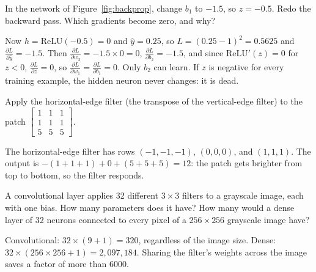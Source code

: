 \begin{Exercise}[label=dl4, title={A dead ReLU}, space=3cm]
In the network of Figure~\ref{fig:backprop}, change $b_1$ to $-1.5$, so $z = -0.5$. Redo the backward pass. Which
gradients become zero, and why?
\end{Exercise}
\begin{Answer}[ref=dl4]
Now $h = \mathrm{ReLU}(-0.5) = 0$ and $\hat{y} = 0.25$, so $L = (0.25 - 1)^2 = 0.5625$ and
$\frac{\partial L}{\partial \hat{y}} = -1.5$. Then $\frac{\partial L}{\partial w_2} = -1.5 \times 0 = 0$,
$\frac{\partial L}{\partial b_2} = -1.5$, and since $\mathrm{ReLU}'(z) = 0$ for $z < 0$,
$\frac{\partial L}{\partial z} = 0$, so $\frac{\partial L}{\partial w_1} = \frac{\partial L}{\partial b_1} = 0$. Only
$b_2$ can learn. If $z$ is negative for every training example, the hidden neuron never changes: it is dead.
\end{Answer}

\begin{Exercise}[label=dl5, title={Filter by hand}, space=3cm]
Apply the horizontal-edge filter (the transpose of the vertical-edge filter) to the patch
$\begin{bmatrix} 1 & 1 & 1 \\ 1 & 1 & 1 \\ 5 & 5 & 5 \end{bmatrix}$.
\end{Exercise}
\begin{Answer}[ref=dl5]
The horizontal-edge filter has rows $(-1, -1, -1)$, $(0, 0, 0)$, and $(1, 1, 1)$. The output is
$-(1 + 1 + 1) + 0 + (5 + 5 + 5) = 12$: the patch gets brighter from top to bottom, so the filter responds.
\end{Answer}

\begin{Exercise}[label=dl6, title={Count the weights}]
A convolutional layer applies 32 different $3 \times 3$ filters to a grayscale image, each with one bias. How many
parameters does it have? How many would a dense layer of 32 neurons connected to every pixel of a $256 \times 256$
grayscale image have?
\end{Exercise}
\begin{Answer}[ref=dl6]
Convolutional: $32 \times (9 + 1) = 320$, regardless of the image size. Dense: $32 \times (256 \times 256 + 1) =
2{,}097{,}184$. Sharing the filter's weights across the image saves a factor of more than 6000.
\end{Answer}
